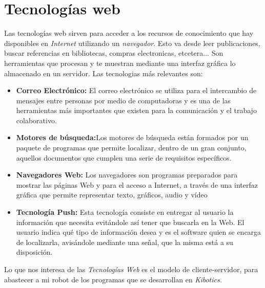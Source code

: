 \section{Tecnologías web}
\label{sec:web}
Las tecnologías web sirven para acceder a los recursos de conocimiento que hay disponibles en \textit{Internet} utilizando un \textit{navegador}. Esto va desde leer publicaciones, buscar referencias en bibliotecas, compras electronicas, etcetera... Son herramientas que procesan y te muestran mediante una interfaz gráfica lo almacenado en un servidor. Las tecnologias más relevantes son:
\begin{itemize}
\item \textbf{Correo Electrónico:} El correo electrónico se utiliza para el intercambio de mensajes entre personas por medio de computadoras y es una de las herramientas más importantes que existen para la comunicación y el trabajo colaborativo. 
\item \textbf{Motores de búsqueda:}Los motores de búsqueda están formados por un paquete de programas que permite localizar, dentro de un gran conjunto, aquellos documentos que cumplen una serie de requisitos específicos.
\item \textbf{Navegadores Web:} Los navegadores son programas preparados para mostrar las páginas Web y para el acceso a Internet, a través de una interfaz gráfica que permite representar texto, gráficos, audio y vídeo
\item \textbf{Tecnología Push:} Esta tecnología consiste en entregar al usuario la información que necesita evitándole así tener que buscarla en la Web. El usuario indica qué tipo de información desea y es el software quien se encarga de localizarla, avisándole mediante una señal, que la misma está a su disposición. 
\end{itemize}{}
Lo que nos interesa de las \textit{Tecnologías Web} es el modelo de cliente-servidor, para abastecer a mi robot de los programas que se desarrollan en \textit{Kibotics.}
